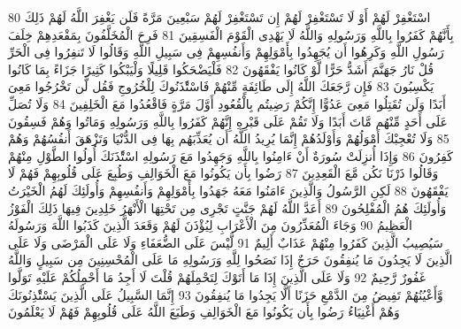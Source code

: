 \documentclass[20pt,a4paper]{article}
\begin{document}
{\tiny\colorbox{cl_aya}{80}} اسْتَغْفِرْ لَهُمْ أَوْ لَا تَسْتَغْفِرْ لَهُمْ إِن تَسْتَغْفِرْ لَهُمْ سَبْعِينَ مَرَّةً فَلَن يَغْفِرَ اللَّهُ لَهُمْ ذَلِكَ بِأَنَّهُمْ كَفَرُوا بِاللَّهِ وَرَسُولِهِ وَاللَّهُ لَا يَهْدِى الْقَوْمَ الْفَسِقِينَ
{\tiny\colorbox{cl_aya}{81}} فَرِحَ الْمُخَلَّفُونَ بِمَقْعَدِهِمْ خِلَفَ رَسُولِ اللَّهِ وَكَرِهُوا أَن يُجَهِدُوا بِأَمْوَلِهِمْ وَأَنفُسِهِمْ فِى سَبِيلِ اللَّهِ وَقَالُوا لَا تَنفِرُوا فِى الْحَرِّ قُلْ نَارُ جَهَنَّمَ أَشَدُّ حَرًّا لَّوْ كَانُوا يَفْقَهُونَ
{\tiny\colorbox{cl_aya}{82}} فَلْيَضْحَكُوا قَلِيلًا وَلْيَبْكُوا كَثِيرًا جَزَاءً بِمَا كَانُوا يَكْسِبُونَ
{\tiny\colorbox{cl_aya}{83}} فَإِن رَّجَعَكَ اللَّهُ إِلَى طَائِفَةٍ مِّنْهُمْ فَاسْتَْٔذَنُوكَ لِلْخُرُوجِ فَقُل لَّن تَخْرُجُوا مَعِىَ أَبَدًا وَلَن تُقَتِلُوا مَعِىَ عَدُوًّا إِنَّكُمْ رَضِيتُم بِالْقُعُودِ أَوَّلَ مَرَّةٍ فَاقْعُدُوا مَعَ الْخَلِفِينَ
{\tiny\colorbox{cl_aya}{84}} وَلَا تُصَلِّ عَلَى أَحَدٍ مِّنْهُم مَّاتَ أَبَدًا وَلَا تَقُمْ عَلَى قَبْرِهِ إِنَّهُمْ كَفَرُوا بِاللَّهِ وَرَسُولِهِ وَمَاتُوا وَهُمْ فَسِقُونَ
{\tiny\colorbox{cl_aya}{85}} وَلَا تُعْجِبْكَ أَمْوَلُهُمْ وَأَوْلَدُهُمْ إِنَّمَا يُرِيدُ اللَّهُ أَن يُعَذِّبَهُم بِهَا فِى الدُّنْيَا وَتَزْهَقَ أَنفُسُهُمْ وَهُمْ كَفِرُونَ
{\tiny\colorbox{cl_aya}{86}} وَإِذَا أُنزِلَتْ سُورَةٌ أَنْ ءَامِنُوا بِاللَّهِ وَجَهِدُوا مَعَ رَسُولِهِ اسْتَْٔذَنَكَ أُولُوا الطَّوْلِ مِنْهُمْ وَقَالُوا ذَرْنَا نَكُن مَّعَ الْقَعِدِينَ
{\tiny\colorbox{cl_aya}{87}} رَضُوا بِأَن يَكُونُوا مَعَ الْخَوَالِفِ وَطُبِعَ عَلَى قُلُوبِهِمْ فَهُمْ لَا يَفْقَهُونَ
{\tiny\colorbox{cl_aya}{88}} لَكِنِ الرَّسُولُ وَالَّذِينَ ءَامَنُوا مَعَهُ جَهَدُوا بِأَمْوَلِهِمْ وَأَنفُسِهِمْ وَأُولَئِكَ لَهُمُ الْخَيْرَتُ وَأُولَئِكَ هُمُ الْمُفْلِحُونَ
{\tiny\colorbox{cl_aya}{89}} أَعَدَّ اللَّهُ لَهُمْ جَنَّتٍ تَجْرِى مِن تَحْتِهَا الْأَنْهَرُ خَلِدِينَ فِيهَا ذَلِكَ الْفَوْزُ الْعَظِيمُ
{\tiny\colorbox{cl_aya}{90}} وَجَاءَ الْمُعَذِّرُونَ مِنَ الْأَعْرَابِ لِيُؤْذَنَ لَهُمْ وَقَعَدَ الَّذِينَ كَذَبُوا اللَّهَ وَرَسُولَهُ سَيُصِيبُ الَّذِينَ كَفَرُوا مِنْهُمْ عَذَابٌ أَلِيمٌ
{\tiny\colorbox{cl_aya}{91}} لَّيْسَ عَلَى الضُّعَفَاءِ وَلَا عَلَى الْمَرْضَى وَلَا عَلَى الَّذِينَ لَا يَجِدُونَ مَا يُنفِقُونَ حَرَجٌ إِذَا نَصَحُوا لِلَّهِ وَرَسُولِهِ مَا عَلَى الْمُحْسِنِينَ مِن سَبِيلٍ وَاللَّهُ غَفُورٌ رَّحِيمٌ
{\tiny\colorbox{cl_aya}{92}} وَلَا عَلَى الَّذِينَ إِذَا مَا أَتَوْكَ لِتَحْمِلَهُمْ قُلْتَ لَا أَجِدُ مَا أَحْمِلُكُمْ عَلَيْهِ تَوَلَّوا وَّأَعْيُنُهُمْ تَفِيضُ مِنَ الدَّمْعِ حَزَنًا أَلَّا يَجِدُوا مَا يُنفِقُونَ
{\tiny\colorbox{cl_aya}{93}} إِنَّمَا السَّبِيلُ عَلَى الَّذِينَ يَسْتَْٔذِنُونَكَ وَهُمْ أَغْنِيَاءُ رَضُوا بِأَن يَكُونُوا مَعَ الْخَوَالِفِ وَطَبَعَ اللَّهُ عَلَى قُلُوبِهِمْ فَهُمْ لَا يَعْلَمُونَ
\end{document}
